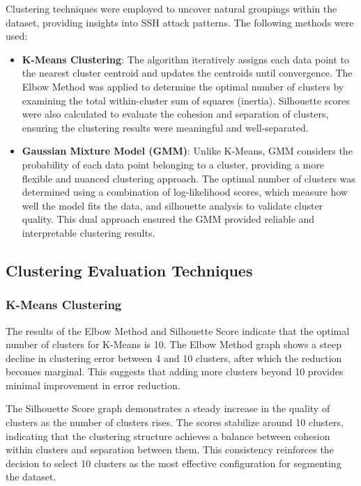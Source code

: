         Clustering techniques were employed to uncover natural groupings within the dataset, providing insights into SSH attack patterns. The following methods were used:
        
        \begin{itemize}
        
            \item \textbf{K-Means Clustering}: The algorithm iteratively assigns each data point to the nearest cluster centroid and updates the centroids until convergence. The Elbow Method was applied to determine the optimal number of clusters by examining the total within-cluster sum of squares (inertia). Silhouette scores were also calculated to evaluate the cohesion and separation of clusters, ensuring the clustering results were meaningful and well-separated.
            
            \item \textbf{Gaussian Mixture Model (GMM)}: Unlike K-Means, GMM considers the probability of each data point belonging to a cluster, providing a more flexible and nuanced clustering approach. The optimal number of clusters was determined using a combination of log-likelihood scores, which measure how well the model fits the data, and silhouette analysis to validate cluster quality. This dual approach ensured the GMM provided reliable and interpretable clustering results.
            
        \end{itemize}
        
    \subsection{Clustering Evaluation Techniques}
    
        \subsubsection{K-Means Clustering \\}
        
            The results of the Elbow Method and Silhouette Score indicate that the optimal number of clusters for K-Means is 10. The Elbow Method graph shows a steep decline in clustering error between 4 and 10 clusters, after which the reduction becomes marginal. This suggests that adding more clusters beyond 10 provides minimal improvement in error reduction.

            The Silhouette Score graph demonstrates a steady increase in the quality of clusters as the number of clusters rises. The scores stabilize around 10 clusters, indicating that the clustering structure achieves a balance between cohesion within clusters and separation between them. This consistency reinforces the decision to select 10 clusters as the most effective configuration for segmenting the dataset.

